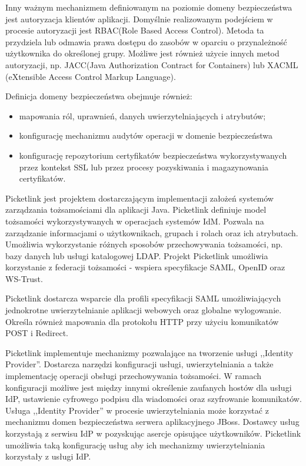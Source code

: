 		Inny ważnym mechanizmem definiowanym na poziomie domeny bezpieczeństwa jest autoryzacja klientów aplikacji. Domyślnie realizowanym podejściem w procesie autoryzacji jest RBAC(Role Based Access Control). Metoda ta przydziela lub odmawia prawa dostępu do zasobów w oparciu o przynależność użytkownika do określonej grupy. Możliwe jest również użycie innych metod autoryzacji, np. JACC(Java Authorization Contract for Containers) lub XACML (eXtensible Access Control Markup Language). 

		Definicja domeny bezpieczeństwa obejmuje również:

		\begin{itemize}
			\item mapowania ról, uprawnień, danych uwierzytelniających i atrybutów; 
			\item konfigurację mechanizmu audytów operacji w domenie bezpieczeństwa
			\item konfigurację repozytorium certyfikatów bezpieczeństwa wykorzystywanych przez kontekst SSL lub przez procesy pozyskiwania i magazynowania certyfikatów.
		\end{itemize}


\label{sec:picketlink}

Picketlink jest projektem dostarczającym implementacji założeń systemów zarządzania tożsamościami dla aplikacji Java. Picketlink definiuje model tożsamości wykorzystywanych w operacjach systemów IdM. Pozwala na zarządzanie informacjami o użytkownikach, grupach i rolach oraz ich atrybutach. Umożliwia wykorzystanie różnych sposobów przechowywania tożsamości, np. bazy danych lub usługi katalogowej LDAP. Projekt Picketlink umożliwia korzystanie z federacji tożsamości - wspiera specyfikacje SAML, OpenID oraz WS-Trust\cite{PicketLink13}.

Picketlink dostarcza wsparcie dla profili specyfikacji SAML umożliwiających jednokrotne uwierzytelnianie aplikacji webowych oraz globalne wylogowanie. Określa również mapowania dla protokołu HTTP przy użyciu komunikatów POST i Redirect. 

Picketlink implementuje mechanizmy pozwalające na tworzenie usługi ,,Identity Provider''. Dostarcza narzędzi konfiguracji usługi, uwierzytelniania a także implementację operacji obsługi przechowywania tożsamości. W ramach konfiguracji możliwe jest między innymi określenie zaufanych hostów dla usługi IdP, ustawienie cyfrowego podpisu dla wiadomości oraz szyfrowanie komunikatów. Usługa ,,Identity Provider'' w procesie uwierzytelniania może korzystać z mechanizmu domen bezpieczeństwa serwera aplikacyjnego JBoss. Dostawcy usług korzystają z serwisu IdP w pozyskując asercje opisujące użytkowników. Picketlink umożliwia taką konfigurację usług aby ich mechanizmy uwierzytelniania korzystały z usługi IdP.

